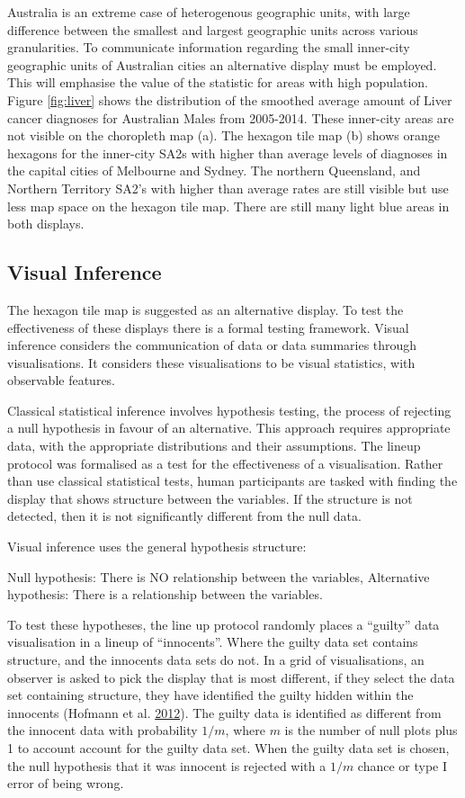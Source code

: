 \documentclass[conference,final,]{IEEEtran}
\begin{document}
Australia is an extreme case of heterogenous geographic units, with
large difference between the smallest and largest geographic units
across various granularities. To communicate information regarding the
small inner-city geographic units of Australian cities an alternative
display must be employed. This will emphasise the value of the statistic
for areas with high population. Figure \ref{fig:liver} shows the
distribution of the smoothed average amount of Liver cancer diagnoses
for Australian Males from 2005-2014. These inner-city areas are not
visible on the choropleth map (a). The hexagon tile map (b) shows orange
hexagons for the inner-city SA2s with higher than average levels of
diagnoses in the capital cities of Melbourne and Sydney. The northern
Queensland, and Northern Territory SA2's with higher than average rates
are still visible but use less map space on the hexagon tile map. There
are still many light blue areas in both displays.

\hypertarget{visual-inference}{%
\subsection{Visual Inference}\label{visual-inference}}

The hexagon tile map is suggested as an alternative display. To test the
effectiveness of these displays there is a formal testing framework.
Visual inference considers the communication of data or data summaries
through visualisations. It considers these visualisations to be visual
statistics, with observable features.

Classical statistical inference involves hypothesis testing, the process
of rejecting a null hypothesis in favour of an alternative. This
approach requires appropriate data, with the appropriate distributions
and their assumptions. The lineup protocol was formalised as a test for
the effectiveness of a visualisation. Rather than use classical
statistical tests, human participants are tasked with finding the
display that shows structure between the variables. If the structure is
not detected, then it is not significantly different from the null data.

Visual inference uses the general hypothesis structure:

Null hypothesis: There is NO relationship between the variables,
Alternative hypothesis: There is a relationship between the variables.

To test these hypotheses, the line up protocol randomly places a
``guilty'' data visualisation in a lineup of ``innocents''. Where the
guilty data set contains structure, and the innocents data sets do not.
In a grid of visualisations, an observer is asked to pick the display
that is most different, if they select the data set containing
structure, they have identified the guilty hidden within the innocents
(Hofmann et al. \protect\hyperlink{ref-GTPCCD}{2012}). The guilty data
is identified as different from the innocent data with probability
\(1/m\), where \(m\) is the number of null plots plus 1 to account
account for the guilty data set. When the guilty data set is chosen, the
null hypothesis that it was innocent is rejected with a \(1/m\) chance
or type I error of being wrong.
\end{document}
